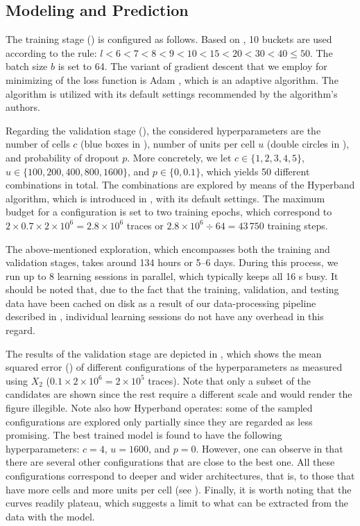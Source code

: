 \subsection{Modeling and Prediction}
The training stage () is configured as follows. Based on
, 10 buckets are used according to the rule: $l < 6 < 7 < 8 < 9 <
10 < 15 < 20 < 30 < 40 \leq 50$. The batch size $b$ is set to 64. The variant of
gradient descent that we employ for minimizing of the loss function is Adam
\cite{kingma2014}, which is an adaptive algorithm. The algorithm is utilized
with its default settings recommended by the algorithm's authors.

Regarding the validation stage (), the considered
hyperparameters are the number of cells $c$ (blue boxes in ), number
of units per cell $u$ (double circles in ), and probability of
dropout $p$. More concretely, we let $c \in \{1, 2, 3, 4, 5\}$, $u \in \{100,
200, 400, 800, 1600\}$, and $p \in \{0, 0.1\}$, which yields 50 different
combinations in total. The combinations are explored by means of the Hyperband
algorithm, which is introduced in , with its default settings.
The maximum budget for a configuration is set to two training epochs, which
correspond to $2 \times 0.7 \times 2 \times 10^6 = 2.8 \times 10^6$ traces or
$2.8 \times 10^6 \div 64 = 43\,750$ training steps.

The above-mentioned exploration, which encompasses both the training and
validation stages, takes around 134 hours or 5--6 days. During this process, we
run up to 8 learning sessions in parallel, which typically keeps all 16
s busy. It should be noted that, due to the fact that the training,
validation, and testing data have been cached on disk as a result of our
data-processing pipeline described in , individual learning sessions
do not have any overhead in this regard.


The results of the validation stage are depicted in , which
shows the mean squared error () of different configurations of the
hyperparameters as measured using $X_2$ ($0.1 \times 2 \times 10^6 = 2 \times
10^5$ traces). Note that only a subset of the candidates are shown since the
rest require a different scale and would render the figure illegible. Note also
how Hyperband operates: some of the sampled configurations are explored only
partially since they are regarded as less promising. The best trained model is
found to have the following hyperparameters: $c = 4$, $u = 1600$, and $p = 0$.
However, one can observe in  that there are several other
configurations that are close to the best one. All these configurations
correspond to deeper and wider architectures, that is, to those that have more
cells and more units per cell (see ). Finally, it is worth noting
that the curves readily plateau, which suggests a limit to what can be extracted
from the data with the model.

